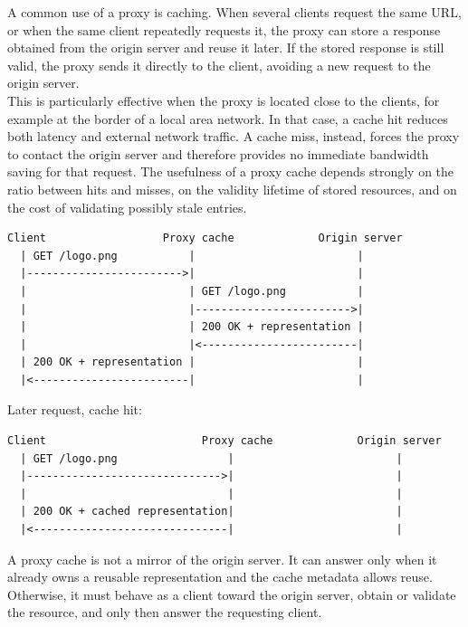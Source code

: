 \documentclass{scrbook}
\begin{document}
A common use of a proxy is caching. When several clients request the same URL, or when the same client repeatedly requests it, the proxy can store a response obtained from the origin server and reuse it later. If the stored response is still valid, the proxy sends it directly to the client, avoiding a new request to the origin server.\\

This is particularly effective when the proxy is located close to the clients, for example at the border of a local area network. In that case, a cache hit reduces both latency and external network traffic. A cache miss, instead, forces the proxy to contact the origin server and therefore provides no immediate bandwidth saving for that request. The usefulness of a proxy cache depends strongly on the ratio between hits and misses, on the validity lifetime of stored resources, and on the cost of validating possibly stale entries.

\newpage
\begin{lstlisting}
Client                  Proxy cache             Origin server
  | GET /logo.png           |                         |
  |------------------------>|                         |
  |                         | GET /logo.png           |
  |                         |------------------------>|
  |                         | 200 OK + representation |
  |                         |<------------------------|
  | 200 OK + representation |                         |
  |<------------------------|                         |
\end{lstlisting}

Later request, cache hit:

\begin{lstlisting}
Client                        Proxy cache             Origin server
  | GET /logo.png                 |                         |
  |------------------------------>|                         |
  |                               |                         |
  | 200 OK + cached representation|                         |
  |<------------------------------|                         |
\end{lstlisting}

A proxy cache is not a mirror of the origin server. It can answer only when it already owns a reusable representation and the cache metadata allows reuse. Otherwise, it must behave as a client toward the origin server, obtain or validate the resource, and only then answer the requesting client.
\end{document}
